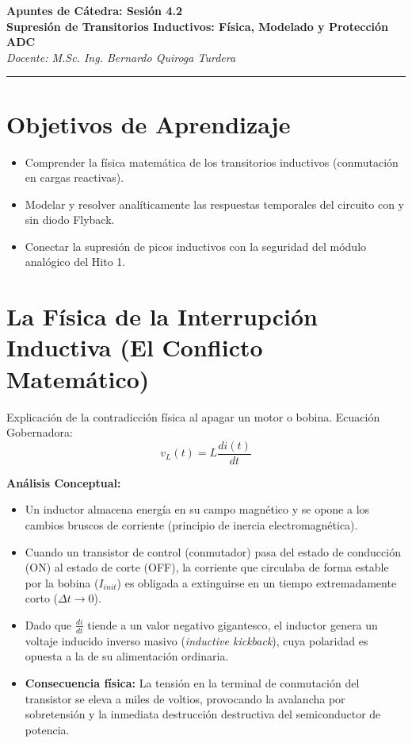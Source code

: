 \documentclass[11pt, a4paper]{article}
\begin{document}
\begin{center}
    {\LARGE \textbf{Apuntes de Cátedra: Sesión 4.2}}\\[0.3cm]
    {\large \textbf{Supresión de Transitorios Inductivos: Física, Modelado y Protección ADC}}\\
    \textit{Docente: M.Sc. Ing. Bernardo Quiroga Turdera}
    \vspace{0.3cm}
    \hrule
\end{center}

\vspace{0.3cm}

\section*{Objetivos de Aprendizaje}
\begin{itemize}
    \item Comprender la física matemática de los transitorios inductivos (conmutación en cargas reactivas).
    \item Modelar y resolver analíticamente las respuestas temporales del circuito con y sin diodo Flyback.
    \item Conectar la supresión de picos inductivos con la seguridad del módulo analógico del Hito 1.
\end{itemize}

\section{La Física de la Interrupción Inductiva (El Conflicto Matemático)}
Explicación de la contradicción física al apagar un motor o bobina. Ecuación Gobernadora:
\begin{equation}
    v_L(t) = L \frac{di(t)}{dt}
\end{equation}

\textbf{Análisis Conceptual:}
\begin{itemize}
    \item Un inductor almacena energía en su campo magnético y se opone a los cambios bruscos de corriente (principio de inercia electromagnética).
    \item Cuando un transistor de control (conmutador) pasa del estado de conducción (ON) al estado de corte (OFF), la corriente que circulaba de forma estable por la bobina ($I_{init}$) es obligada a extinguirse en un tiempo extremadamente corto ($\Delta t \to 0$).
    \item Dado que $\frac{di}{dt}$ tiende a un valor negativo gigantesco, el inductor genera un voltaje inducido inverso masivo (\textit{inductive kickback}), cuya polaridad es opuesta a la de su alimentación ordinaria.
    \item \textbf{Consecuencia física:} La tensión en la terminal de conmutación del transistor se eleva a miles de voltios, provocando la avalancha por sobretensión y la inmediata destrucción destructiva del semiconductor de potencia.
\end{itemize}
\end{document}
